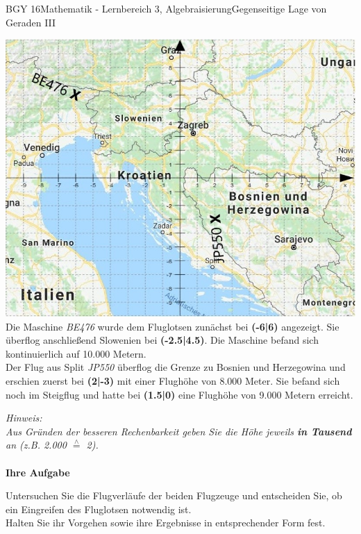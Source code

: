 \documentclass[oneside,openany,headings=optiontotoc,11pt,numbers=noenddot]{scrreprt}
\begin{document}
	\begin{worksheet}{BGY 16}{Mathematik - Lernbereich 3, Algebraisierung}{Gegenseitige Lage von Geraden III}
		
		\begin{framed}
		\noindent
		\includegraphics[scale=0.73]{Bilder/KroatienKoordFluge.jpg}\\
		Die Maschine \textit{BE476} wurde dem Fluglotsen zunächst bei \textbf{(-6|6)} angezeigt. Sie überflog anschließend Slowenien bei \textbf{(-2.5|4.5)}. Die Maschine befand sich kontinuierlich auf 10.000 Metern.\\
		Der Flug aus Split \textit{JP550} überflog die Grenze zu Bosnien und Herzegowina und erschien zuerst bei \textbf{(2|-3)} mit einer Flughöhe von 8.000 Meter. Sie befand sich noch im Steigflug und hatte bei \textbf{(1.5|0)} eine Flughöhe von 9.000 Metern erreicht.\\
		\par
		\small{\textit{Hinweis:\\Aus Gründen der besseren Rechenbarkeit geben Sie die Höhe jeweils \textbf{in Tausend} an (z.B. 2.000 \(\overset{\wedge}{=}\) 2).}}\\
		\hdashrule[0.5ex][x]{\textwidth}{0.1mm}{8mm 2pt}\\
		\Large{\textbf{Ihre Aufgabe}}
		\normalsize
		\par\bigskip\noindent
		Untersuchen Sie die Flugverläufe der beiden Flugzeuge und entscheiden Sie, ob ein Eingreifen des Fluglotsen notwendig ist.\\
		Halten Sie ihr Vorgehen sowie ihre Ergebnisse in entsprechender Form fest.
		\end{framed}
	\end{worksheet}
\end{document}
